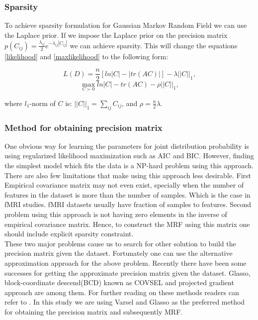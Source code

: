 \documentclass{article} %
\begin{document}
\subsubsection{Sparsity}
To achieve sparsity formulation for Gaussian Markov Random Field we can use 
the Laplace prior. If we impose the Laplace prior on the precision matrix 
$p(C_{ij}) = \frac{\lambda_{ij}}{2} e^{-\lambda_{ij}|C_{ij}|} $ we can 
achieve sparsity. This will change the equations \eqref{likelihood} and 
\eqref{maxlikelihood} to the following form:

\begin{multicols}{2}
\begin{equation}\label{loglikelihood}
L(D) = \frac{n}{2} [ln|C| -  |tr(AC)|] - \lambda||C||_{1}, 
\end{equation}\break
\begin{equation}\label{logmaxlikelihood}
\max_{C\succ0} ln|C| - tr(AC) - \rho||C||_{1},
\end{equation}
\end{multicols}

where $l_{1}$-norm of $C$ is: $||C||_{1}= \sum_{ij}C_{ij}$, and $\rho=\frac{n}{2}\lambda $. \\


\subsubsection{Method for obtaining precision matrix}  
One obvious way for learning the parameters for joint distribution probability 
is using regularized likelihood maximization such as AIC and BIC. However, 
finding the simplest model which fits the data is a NP-hard problem using this 
approach. There are also few limitations that make using this approach less 
desirable. First Empirical covariance matrix may not even exist, specially when 
the number of features in the dataset is more than the number of samples. Which 
is the case in fMRI studies. fMRI datasets usually have fraction of samples to 
features. Second problem using this approach is not having zero elements in the 
inverse of empirical covariance matrix. Hence, to construct the MRF using this 
matrix one should include explicit sparsity constraint.\cite{Rish2014Book} \\

These two major problems cause us to search for other solution to build the 
precision matrix given the dataset. Fortunately one can use the alternative 
approximation approach for the above problem. Recently there have been some 
successes for getting the approximate precision matrix given the dataset. 
Glasso\cite{glasso}, block-coordinate descend(BCD) known as COVSEL and projected gradient 
approach are among them. For further reading on these methods readers can 
refer to \cite{Rish2014Book}. In this study we are using Varsel and Glasso as 
the preferred method for obtaining the precision matrix and subsequently MRF.   
\end{document}
